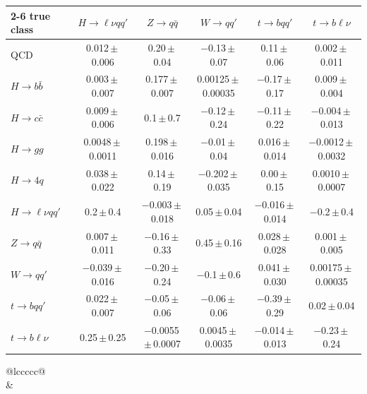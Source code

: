 \begin{landscape}
{\begin{center}
\begin{minipage}{\linewidth}
\begin{tabular*}{\linewidth}{@{\extracolsep{\fill}}lccccc@{}}
\cmidrule(lr){2-6}
true class & $H\to \ell\nu qq'$ & $Z\to q\bar q$ & $W\to qq'$ & $t\to bqq'$ & $t\to b\ell\nu$ \\
\midrule
QCD & 0.012\,$\pm$\,0.006 & 0.20\,$\pm$\,0.04 & $-$0.13\,$\pm$\,0.07 & 0.11\,$\pm$\,0.06 & 0.002\,$\pm$\,0.011 \\
$H\to b\bar b$ & 0.003\,$\pm$\,0.007 & 0.177\,$\pm$\,0.007 & 0.00125\,$\pm$\,0.00035 & $-$0.17\,$\pm$\,0.17 & 0.009\,$\pm$\,0.004 \\
$H\to c\bar c$ & 0.009\,$\pm$\,0.006 & 0.1\,$\pm$\,0.7 & $-$0.12\,$\pm$\,0.24 & $-$0.11\,$\pm$\,0.22 & $-$0.004\,$\pm$\,0.013 \\
$H\to gg$ & 0.0048\,$\pm$\,0.0011 & 0.198\,$\pm$\,0.016 & $-$0.01\,$\pm$\,0.04 & 0.016\,$\pm$\,0.014 & $-$0.0012\,$\pm$\,0.0032 \\
$H\to 4q$ & 0.038\,$\pm$\,0.022 & 0.14\,$\pm$\,0.19 & $-$0.202\,$\pm$\,0.035 & 0.00\,$\pm$\,0.15 & 0.0010\,$\pm$\,0.0007 \\
$H\to \ell\nu qq'$ & 0.2\,$\pm$\,0.4 & $-$0.003\,$\pm$\,0.018 & 0.05\,$\pm$\,0.04 & $-$0.016\,$\pm$\,0.014 & $-$0.2\,$\pm$\,0.4 \\
$Z\to q\bar q$ & 0.007\,$\pm$\,0.011 & $-$0.16\,$\pm$\,0.33 & 0.45\,$\pm$\,0.16 & 0.028\,$\pm$\,0.028 & 0.001\,$\pm$\,0.005 \\
$W\to qq'$ & $-$0.039\,$\pm$\,0.016 & $-$0.20\,$\pm$\,0.24 & $-$0.1\,$\pm$\,0.6 & 0.041\,$\pm$\,0.030 & 0.00175\,$\pm$\,0.00035 \\
$t\to bqq'$ & 0.022\,$\pm$\,0.007 & $-$0.05\,$\pm$\,0.06 & $-$0.06\,$\pm$\,0.06 & $-$0.39\,$\pm$\,0.29 & 0.02\,$\pm$\,0.04 \\
$t\to b\ell\nu$ & 0.25\,$\pm$\,0.25 & $-$0.0055\,$\pm$\,0.0007 & 0.0045\,$\pm$\,0.0035 & $-$0.014\,$\pm$\,0.013 & $-$0.23\,$\pm$\,0.24 \\
\bottomrule
\end{tabular*}
\end{minipage}
\end{center}
\newpage
\begin{center}
\begin{minipage}{\linewidth}\centering
{}
\par\smallskip
\begin{tabular*}{\linewidth}{@{\extracolsep{\fill}}lccccc@{}}
\toprule
{} \\
\midrule
 &  \\

\end{tabular*}
\end{minipage}
\end{center}}
\end{landscape}
